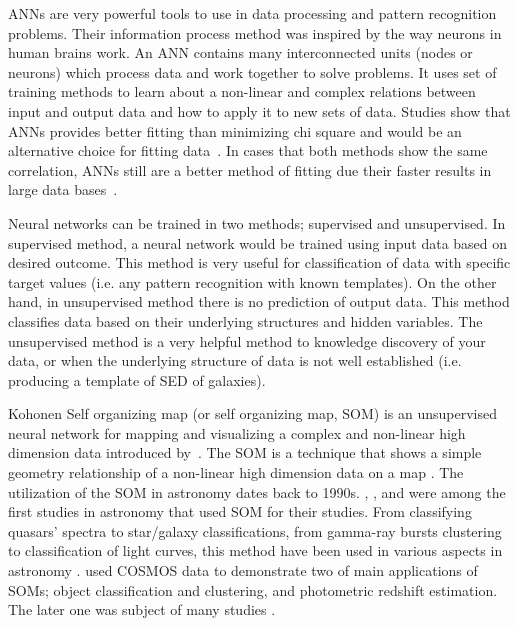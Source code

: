 ANNs are very powerful tools to use in data processing and pattern recognition problems.
Their information process method was inspired by the way neurons in human brains work.
An ANN contains many interconnected units (nodes or neurons) which process data and work together to solve problems.
It uses set of training methods to learn about a non-linear and complex relations between input and output data and how to apply it to new sets of data.
Studies show that ANNs provides better fitting than minimizing chi square and would be an alternative choice for fitting data~\citep[e.g.][]{Marquez91,Moayed09}.
In cases that both methods show the same correlation, ANNs still are a better method of fitting due their faster results in large data bases~\citep[][]{Gulati97}.

Neural networks can be trained in two methods; supervised and unsupervised.
In supervised method, a neural network would be trained using input data based on desired outcome.
This method is very useful for classification of data with specific target values (i.e. any pattern recognition with known templates).
On the other hand, in unsupervised method there is no prediction of output data.
This method classifies data based on their underlying structures and hidden variables.
The unsupervised method is a very helpful method to knowledge discovery of your data, or when the underlying structure of data is not well established (i.e. producing a template of SED of galaxies).

Kohonen Self organizing map (or self organizing map, SOM) is an unsupervised neural network for mapping and visualizing a complex and non-linear high dimension data introduced by~\citep{Kohonen82}.
The SOM is a technique that shows a simple geometry relationship of a non-linear high dimension data on a map \citep{Kohonen98}.
The utilization of the SOM in astronomy dates back to 1990s. 
\citet[][]{Odewahn92}, \citet[][]{Hernandez94}, and \citet[][]{Murtagh95} were among the first studies in astronomy that used SOM for their studies.
From classifying quasars' spectra to star/galaxy classifications, from gamma-ray bursts clustering to classification of light curves, this method have been used in various aspects in astronomy \citep[e.g.][]{Maehoenen95, Miller96,Andreon00,Balastegui01,Rajaniemi02,Brett04,Scaringi09}.
\citet{Geach12} used COSMOS data to demonstrate two of main applications of SOMs; object classification and clustering, and photometric redshift estimation. 
The later one was subject of many studies \citep[e.g.][]{Kind14a}.

